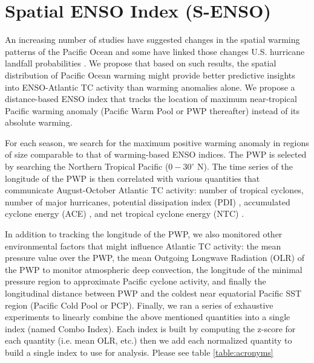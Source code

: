 \documentclass[]{article}
\begin{document}


\section{Spatial ENSO Index (S-ENSO)}
An increasing number of studies have suggested changes in the spatial warming patterns of the Pacific Ocean and some have linked those changes U.S. hurricane landfall probabilities \cite{kim2009}. We propose that based on such results, the spatial distribution of Pacific Ocean warming might provide better predictive insights into ENSO-Atlantic TC activity than warming anomalies alone. We propose a distance-based ENSO index that tracks the location of maximum near-tropical Pacific warming anomaly (Pacific Warm Pool or PWP thereafter) instead of its absolute warming.

For each season, we search for the maximum positive warming anomaly in regions of size comparable to that of warming-based ENSO indices. The PWP is selected by searching the Northern Tropical Pacific ($0-30^\circ$ N). The time series of the longitude of the PWP is then correlated with various quantities that communicate August-October Atlantic TC activity: number of tropical cyclones, number of major hurricanes, potential dissipation index (PDI) \cite{emanuel2005a}, accumulated cyclone energy (ACE) \cite{Bell2000}, and net tropical cyclone energy (NTC) \cite{goldenberg2001}.

In addition to tracking the longitude of the PWP, we also monitored other environmental factors that might influence Atlantic TC activity: the mean pressure value over the PWP, the mean Outgoing Longwave Radiation (OLR) of the PWP to monitor atmospheric deep convection, the longitude of the minimal pressure region to approximate Pacific cyclone activity, and finally the longitudinal distance between PWP and the coldest near equatorial Pacific SST region (Pacific Cold Pool or PCP). Finally, we ran a series of exhaustive experiments to linearly combine the above mentioned quantities into a single index (named Combo Index). Each index is built by computing the z-score for each quantity (i.e. mean OLR, etc.) then we add each normalized quantity to build a single index to use for analysis. Please see table \ref{table:acronyms}
\end{document}
